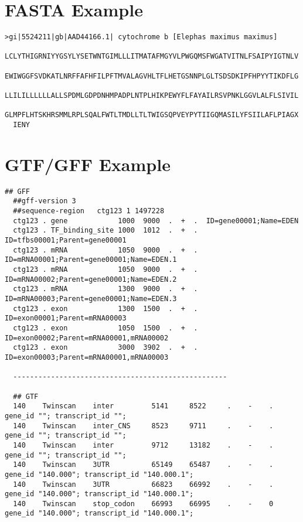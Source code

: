 \section{FASTA Example}
\begin{lstlisting}[numbers=none, breaklines=true]
  >gi|5524211|gb|AAD44166.1| cytochrome b [Elephas maximus maximus]
  LCLYTHIGRNIYYGSYLYSETWNTGIMLLLITMATAFMGYVLPWGQMSFWGATVITNLFSAIPYIGTNLV
  EWIWGGFSVDKATLNRFFAFHFILPFTMVALAGVHLTFLHETGSNNPLGLTSDSDKIPFHPYYTIKDFLG
  LLILILLLLLLALLSPDMLGDPDNHMPADPLNTPLHIKPEWYFLFAYAILRSVPNKLGGVLALFLSIVIL
  GLMPFLHTSKHRSMMLRPLSQALFWTLTMDLLTLTWIGSQPVEYPYTIIGQMASILYFSIILAFLPIAGX
  IENY
\end{lstlisting}

\section{GTF/GFF Example}
\begin{lstlisting}[numbers=none, breaklines=true]
  ## GFF
  ##gff-version 3
  ##sequence-region   ctg123 1 1497228
  ctg123 . gene            1000  9000  .  +  .  ID=gene00001;Name=EDEN
  ctg123 . TF_binding_site 1000  1012  .  +  .  ID=tfbs00001;Parent=gene00001
  ctg123 . mRNA            1050  9000  .  +  .  ID=mRNA00001;Parent=gene00001;Name=EDEN.1
  ctg123 . mRNA            1050  9000  .  +  .  ID=mRNA00002;Parent=gene00001;Name=EDEN.2
  ctg123 . mRNA            1300  9000  .  +  .  ID=mRNA00003;Parent=gene00001;Name=EDEN.3
  ctg123 . exon            1300  1500  .  +  .  ID=exon00001;Parent=mRNA00003
  ctg123 . exon            1050  1500  .  +  .  ID=exon00002;Parent=mRNA00001,mRNA00002
  ctg123 . exon            3000  3902  .  +  .  ID=exon00003;Parent=mRNA00001,mRNA00003

  ---------------------------------------------------

  ## GTF
  140    Twinscan    inter         5141     8522     .    -    .    gene_id ""; transcript_id "";
  140    Twinscan    inter_CNS     8523     9711     .    -    .    gene_id ""; transcript_id "";
  140    Twinscan    inter         9712     13182    .    -    .    gene_id ""; transcript_id "";
  140    Twinscan    3UTR          65149    65487    .    -    .    gene_id "140.000"; transcript_id "140.000.1";
  140    Twinscan    3UTR          66823    66992    .    -    .    gene_id "140.000"; transcript_id "140.000.1";
  140    Twinscan    stop_codon    66993    66995    .    -    0    gene_id "140.000"; transcript_id "140.000.1";
\end{lstlisting}
